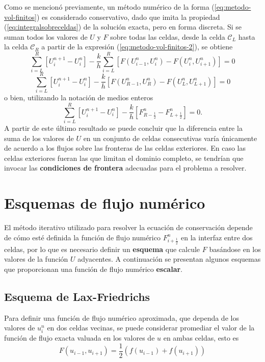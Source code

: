 Como se mencionó previamente, un método numérico de la forma (\ref{eq:metodo-vol-finitos}) es considerado conservativo, dado que imita la propiedad (\ref{eq:integralsobreceldas}) de la solución exacta, pero en forma discreta. Si se suman todos los valores de $U$ y $F$ sobre todas las celdas, desde la celda $\mathcal{C}_L$ hasta la celda $\mathcal{C}_R$ a partir de la expresión (\ref{eq:metodo-vol-finitos-2}), se obtiene
\begin{equation}
 \sum_{i=L}^{R}\left[U_{i}^{n+1}-U_{i}^{n}\right] - 
 \frac{k}{h}\sum_{i=L}^{R}\left[ F(U_{i-1}^n, U_i^n) - F(U_{i}^n, U_{i+1}^n) \right] = 0
\end{equation}
\begin{equation}
	\sum_{i=L}^{R}\left[U_{i}^{n+1}-U_{i}^{n}\right] - 
	\frac{k}{h}\left[F(U_{R-1}^n, U_{R}^n) - F(U_{L}^n, U_{L+1}^n) \right] = 0
\end{equation}
o bien, utilizando la notación de medios enteros
\begin{equation}
	\sum_{i=L}^{R}\left[U_{i}^{n+1}-U_{i}^{n}\right] - \frac{k}{h}\left[F_{R-\frac{1}{2}}^{n} - F_{L+\frac{1}{2}}^{n} \right] = 0.
\end{equation}
A partir de este último resultado se puede concluir que la diferencia entre la suma de los valores de $U$ en un conjunto de celdas consecutivas varía únicamente de acuerdo a los flujos sobre las fronteras de las celdas exteriores. En caso las celdas exteriores fueran las que limitan el dominio completo, se tendrían que invocar las \textbf{condiciones de frontera} adecuadas para el problema a resolver.

\section{Esquemas de flujo numérico}
El método iterativo utilizado para resolver la ecuación de conservación depende de cómo esté definida la función de flujo numérico $F_{i + \frac{1}{2}}^{n}$ en la interfaz entre dos celdas, por lo que es necesario definir un \textbf{esquema} que calcule $F$ basándose en los valores de la función $U$ adyacentes. A continuación se presentan algunos esquemas que proporcionan una función de flujo numérico \textbf{escalar}.

\subsection{Esquema de Lax-Friedrichs}
Para definir una función de flujo numérico aproximada, que dependa de los valores de $u_{i}^{n}$ en dos celdas vecinas, se puede considerar promediar el valor de la función de flujo exacta valuada en los valores de $u$ en ambas celdas, esto es
\begin{equation}
	F(u_{i-1}, u_{i+1}) = \frac{1}{2}\left(f(u_{i-1}) + f(u_{i+	1})\right)
\end{equation}

